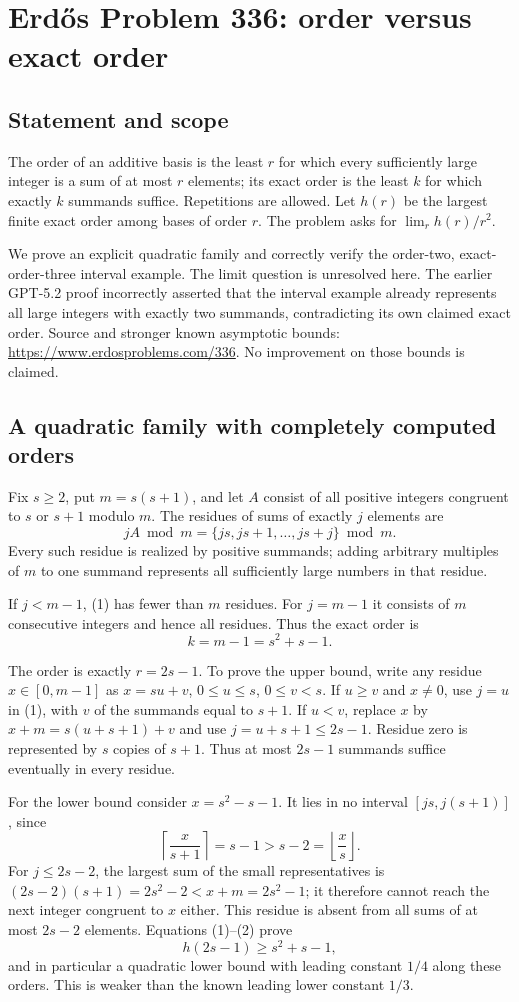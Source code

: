 \section*{Erd\H{o}s Problem 336: order versus exact order}
\subsection*{Statement and scope}
The order of an additive basis is the least $r$ for which every sufficiently large integer is a sum of at most $r$ elements; its exact order is the least $k$ for which exactly $k$ summands suffice. Repetitions are allowed. Let $h(r)$ be the largest finite exact order among bases of order $r$. The problem asks for $\lim_r h(r)/r^2$.

We prove an explicit quadratic family and correctly verify the order-two, exact-order-three interval example. The limit question is unresolved here. The earlier GPT-5.2 proof incorrectly asserted that the interval example already represents all large integers with exactly two summands, contradicting its own claimed exact order. Source and stronger known asymptotic bounds: \url{https://www.erdosproblems.com/336}. No improvement on those bounds is claimed.

\subsection*{A quadratic family with completely computed orders}
Fix $s\ge2$, put $m=s(s+1)$, and let $A$ consist of all positive integers congruent to $s$ or $s+1$ modulo $m$. The residues of sums of exactly $j$ elements are
\[
 jA\bmod m=\{js,js+1,\ldots,js+j\}\bmod m. \tag{1}
\]
Every such residue is realized by positive summands; adding arbitrary multiples of $m$ to one summand represents all sufficiently large numbers in that residue.

If $j<m-1$, (1) has fewer than $m$ residues. For $j=m-1$ it consists of $m$ consecutive integers and hence all residues. Thus the exact order is
\[
 k=m-1=s^2+s-1. \tag{2}
\]

The order is exactly $r=2s-1$. To prove the upper bound, write any residue $x\in[0,m-1]$ as $x=su+v$, $0\le u\le s$, $0\le v<s$. If $u\ge v$ and $x\ne0$, use $j=u$ in (1), with $v$ of the summands equal to $s+1$. If $u<v$, replace $x$ by $x+m=s(u+s+1)+v$ and use $j=u+s+1\le2s-1$. Residue zero is represented by $s$ copies of $s+1$. Thus at most $2s-1$ summands suffice eventually in every residue.

For the lower bound consider $x=s^2-s-1$. It lies in no interval $[js,j(s+1)]$, since
\[
 \left\lceil\frac{x}{s+1}\right\rceil=s-1>
 s-2=\left\lfloor\frac{x}{s}\right\rfloor.
\]
For $j\le2s-2$, the largest sum of the small representatives is
$(2s-2)(s+1)=2s^2-2<x+m=2s^2-1$; it therefore cannot reach the next integer congruent to $x$ either. This residue is absent from all sums of at most $2s-2$ elements. Equations (1)--(2) prove
\[
 h(2s-1)\ge s^2+s-1,
\]
and in particular a quadratic lower bound with leading constant $1/4$ along these orders. This is weaker than the known leading lower constant $1/3$.

